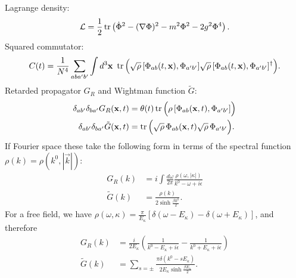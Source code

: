 \documentclass[12pt]{article}
\renewcommand\k{\kappa}
\renewcommand\r{\rho}
\begin{document}
Lagrange density:
\begin{equation}
    \mathcal{L} = \frac{1}{2}\tr\left( \dot{\Phi}^2 -(\nabla\Phi)^2 - m^2 \Phi^2 - 2g^2 \Phi^4\right).
\end{equation}
Squared commutator:
\begin{equation}
    C(t) = \frac{1}{N^4}\sum_{aba'b'}\int d^3\mathbf{x} \ \tr\Big( \sqrt{\rho}\, [\Phi_{ab}(t,\mathbf{x}),\Phi_{a'b'}]\sqrt{\rho}\, [\Phi_{ab}(t,\mathbf{x}),\Phi_{a'b'}]^\dag\Big).
\end{equation}
Retarded propagator $G_R$ and Wightman function $\tilde{G}$:
\begin{align}
\delta_{ab'}\delta_{ba'}G_R(\mathbf{x},t)&= \theta(t) \tr\Big(\rho\,  [\Phi_{ab}(\mathbf{x},t),\Phi_{a'b'}]\Big)\\
\delta_{ab'}\delta_{ba'}\tilde{G}(\mathbf{x},t)&=\tr\Big(\sqrt{\rho}\, \Phi_{ab}(\mathbf{x},t)\sqrt{\rho}\,\Phi_{a'b'}\Big) .
\end{align}
If Fourier space these take the following form in terms of the spectral
function $\r(k) = \r(k^0,|\vec{k}|)$:
\begin{align}
G_R(k) &= i\int \frac{d\omega}{2\pi}\frac{\rho(\omega, |\k|)}{k^0 - \omega + i\epsilon}\\
\tilde{G}(k) &= \frac{\rho(k)}{2\sinh \frac{\beta k^0}{2}}.
\end{align}
For a free field, we have $\rho(\omega,\k) = \frac{\pi}{E_{\k}}[\delta(\omega-E_{\k}) - \delta(\omega + E_{\k})]$, and therefore
\begin{align}
G_R(k) &= \frac{i}{2E_{\k}}\left(\frac{1}{k^0 - E_{\k}+i\epsilon} - \frac{1}{k^0 + E_{\k} + i\epsilon}\right)\label{retardedG}\\
\tilde{G}(k) &= \sum_{s = \pm}\frac{\pi\delta(k^0-sE_\k)}{2E_\k\sinh\frac{\beta E_\k}{2}}.\label{tildeG}
\end{align}
\end{document}
